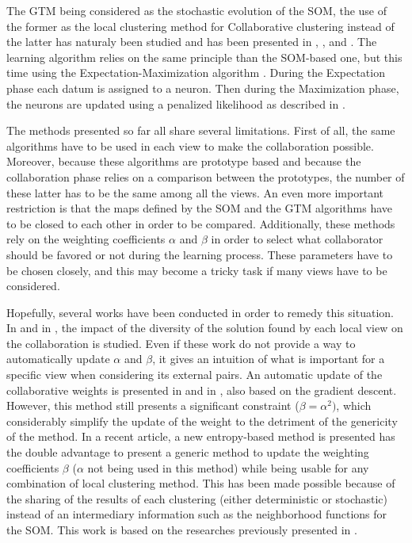 \documentclass[a4paper]{report}
\begin{document}
    The GTM being considered as the stochastic evolution of the SOM, the use of the former as the local clustering method for Collaborative clustering instead of the latter has naturaly been studied and has been presented in \cite{ghassany2012collaborative}, \cite{sublime2015vertical}, \cite{sublime2015horizontal} and \cite{sublime2016collaborative}. The learning algorithm relies on the same principle than the SOM-based one, but this time using the Expectation-Maximization algorithm \cite{dempster1977maximum}. During the Expectation phase each datum is assigned to a neuron. Then during the Maximization phase, the neurons are updated using a penalized likelihood as described in \cite{green1990use}.

    The methods presented so far all share several limitations. First of all, the same algorithms have to be used in each view to make the collaboration possible. Moreover, because these algorithms are prototype based and because the collaboration phase relies on a comparison between the prototypes, the number of these latter has to be the same among all the views. An even more important restriction is that the maps defined by the SOM and the GTM algorithms have to be closed to each other in order to be compared. Additionally, these methods rely on the weighting coefficients $\alpha$ and $\beta$ in order to select what collaborator should be favored or not during the learning process. These parameters have to be chosen closely, and this may become a tricky task if many views have to be considered.

    Hopefully, several works have been conducted in order to remedy this situation. In \cite{grozavu2014diversity} and in \cite{rastin2015collaborative}, the impact of the diversity of the solution found by each local view on the collaboration is studied. Even if these work do not provide a way to automatically update $\alpha$ and $\beta$, it gives an intuition of what is important for a specific view when considering its external pairs. An automatic update of the collaborative weights is presented in \cite{grozavu2010topological} and in \cite{grozavu2011learning}, also based on the gradient descent. However, this method still presents a significant constraint ($\beta = \alpha^2)$, which considerably simplify the update of the weight to the detriment of the genericity of the method. In a recent article, a new entropy-based method is presented \cite{sublime2018optimizing} has the double advantage to present a generic method to update the weighting coefficients $\beta$ ($\alpha$ not being used in this method) while being usable for any combination of local clustering method. This has been made possible because of the sharing of the results of each clustering (either deterministic or stochastic) instead of an intermediary information such as the neighborhood functions for the SOM. This work is based on the researches previously presented in \cite{sublime2016contributions}.

    
    
\end{document}
